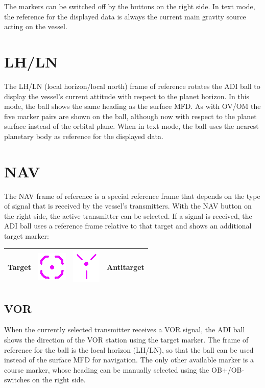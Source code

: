 \documentclass[paper=a4, 11 pt]{report}
\begin{document}
The markers can be switched off by the buttons on the right side.
In text mode, the reference for the displayed data is always the current main gravity source acting on the vessel.

\section{LH/LN}
The LH/LN (local horizon/local north) frame of reference rotates the ADI ball to display the vessel's current attitude with respect to the planet horizon.
In this mode, the ball shows the same heading as the surface MFD.
As with OV/OM the five marker pairs are shown on the ball, although now with respect to the planet surface instead of the orbital plane.
When in text mode, the ball uses the nearest planetary body as reference for the displayed data.

\section{NAV}
The NAV frame of reference is a special reference frame that depends on the type of signal that is received by the vessel's transmitters.
With the NAV button on the right side, the active transmitter can be selected.
If a signal is received, the ADI ball uses a reference frame relative to that target and shows an additional target marker:

\renewcommand{\arraystretch}{2.7}
\begin{center}
\begin{tabular}{ |c  c | c  c| }
  \hline
  Target & \includegraphics[scale=.5]{tgt.png} & \includegraphics[scale=.5]{tgt_2.png} & Antitarget \\ \hline
\end{tabular}
\end{center}


\subsection{VOR}
When the currently selected transmitter receives a VOR signal, the ADI ball shows the direction of the VOR station using the target marker.
The frame of reference for the ball is the local horizon (LH/LN), so that the ball can be used instead of the surface MFD for navigation.
The only other available marker is a course marker, whose heading can be manually selected using the OB+/OB- switches on the right side.
\end{document}

